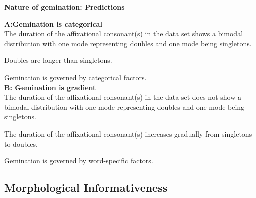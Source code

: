 {\noindent \textbf{Nature of gemination: Predictions}\\	\label{predictions nature of gemination}

\noindent \textbf{A:\hspace{0.5cm}Gemination is categorical} \\



\noindent	The duration of the affixational consonant(s) in the data set shows a bimodal distribution with one mode representing doubles and one mode being singletons.\vspace{0.3 cm}
	
\noindent	Doubles are longer than singletons. \vspace{0.3 cm}
	
\noindent	Gemination is governed by categorical factors.	\\



\noindent	\textbf{B: \hspace{0.5cm}Gemination is gradient} \\
		
\noindent	The duration of the affixational consonant(s) in the data set does not show a bimodal distribution with one mode representing doubles and one mode being singletons. \vspace{0.3 cm}

\noindent	The duration of the affixational consonant(s) increases gradually from singletons to doubles.  \vspace{0.3 cm}
	
\noindent	Gemination is governed by word-specific factors.
	



\subsection{Morphological Informativeness} \label{morphological informativeness}

}
